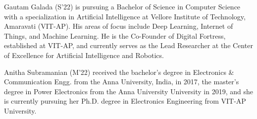 \documentclass[journal,12pt,onecolumn,letterpaper]{IEEEtran}
\begin{document}
\begin{IEEEbiography}
{Gautam Galada} (S'22) is pursuing a Bachelor of Science in Computer Science with a specialization in Artificial Intelligence at Vellore Institute of Technology, Amaravati (VIT-AP). His areas of focus include Deep Learning, Internet of Things, and Machine Learning. He is the Co-Founder of Digital Fortress, established at VIT-AP, and currently serves as the Lead Researcher at the Center of Excellence for Artificial Intelligence and Robotics.
\end{IEEEbiography}

\begin{IEEEbiography}
{Anitha Subramanian} (M'22) received the bachelor's degree in Electronics \& Communication Engg. from the Anna University, India, in 2017, the master’s degree in Power Electronics from the Anna University University in 2019, and she is currently pursuing her Ph.D. degree in Electronics Engineering from VIT-AP University.
\end{IEEEbiography}
\end{document}
